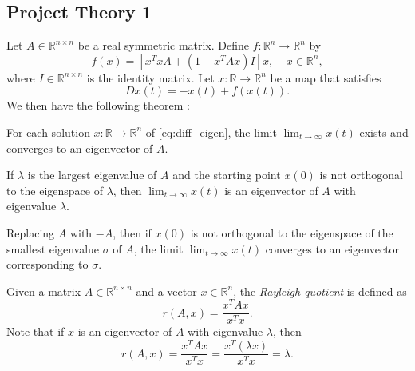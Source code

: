 \subsection{Project Theory 1}\label{sec:project theory}


Let $A\in\mathbb{R}^{n\times n}$ be a real symmetric matrix. Define $f\colon\mathbb{R}^n\to\mathbb{R}^n$ by
\[
f(x)=[x^TxA+(1-x^TAx)I]x,\;\;\;\; x\in\mathbb{R}^n,
\]
where $I\in\mathbb{R}^{n\times n}$ is the identity matrix. Let $x\colon\mathbb{R}\to\mathbb{R}^n$ be a map that satisfies
\begin{equation}\label{eq:diff_eigen}
    Dx(t)=-x(t)+f(x(t)).
\end{equation}
We then have the following theorem \cite{yfh04}:
\begin{theorem}\label{thrm:eigenvector_convergence}
For each solution $x\colon\mathbb{R}\to\mathbb{R}^n$ of \autoref{eq:diff_eigen}, the limit $\lim_{t\to\infty}x(t)$ exists and converges to an eigenvector of $A$.

If $\lambda$ is the largest eigenvalue of $A$ and the starting point $x(0)$ is not orthogonal to the eigenspace of $\lambda$, then $\lim_{t\to\infty}x(t)$ is an eigenvector of $A$ with eigenvalue $\lambda$.

Replacing $A$ with $-A$, then if $x(0)$ is not orthogonal to the eigenspace of the smallest eigenvalue $\sigma$ of $A$, the limit $\lim_{t\to\infty}x(t)$ converges to an eigenvector corresponding to $\sigma$.
\end{theorem}

\begin{definition}\label{def:rayleigh_quotient}
Given a matrix $A\in\mathbb{R}^{n\times n}$ and a vector $x\in\mathbb{R}^n$, the \emph{Rayleigh quotient} is defined as
\begin{equation*}
    r(A,x) = \frac{x^TAx}{x^Tx}.
\end{equation*}
Note that if $x$ is an eigenvector of $A$ with eigenvalue $\lambda$, then
\begin{equation*}
    r(A,x)=\frac{x^TAx}{x^Tx}=\frac{x^T (\lambda x)}{x^T x}=\lambda.
\end{equation*}
\end{definition}